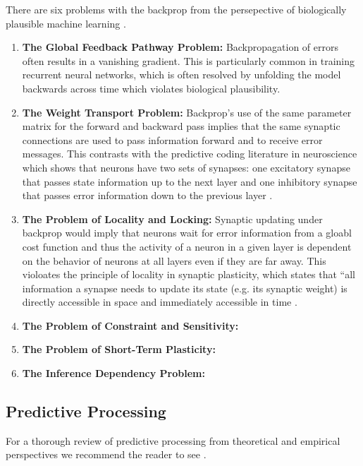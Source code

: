 \documentclass[12pt,english]{article}
\begin{document}
There are six problems with the backprop from the persepective of biologically plausible machine learning \cite{Ororbia22, Ororbia23_a}.
\begin{enumerate}
    \item \textbf{The Global Feedback Pathway Problem:} Backpropagation of errors often results in a vanishing gradient. This is particularly common in training recurrent neural networks, which is  often resolved by unfolding the model backwards across time which violates biological plausibility.
    \item \textbf{The Weight Transport Problem:} Backprop's use of the same parameter matrix for the forward and backward pass implies that the same synaptic connections are used to pass information forward and to receive error messages. This contrasts with the predictive coding literature in neuroscience which shows that neurons have two sets of synapses: one excitatory synapse that passes state information up to the next layer and one inhibitory synapse that passes error information down to the previous layer \cite{WhittingtonBogacz19}.
    \item \textbf{The Problem of Locality and Locking:} Synaptic updating under backprop would imply that neurons wait for error information from a gloabl cost function and thus the activity of a neuron in a given layer is dependent on the behavior of neurons at all layers even if they are far away. This violoates the principle of locality in synaptic plasticity, which states that ``all information a synapse needs to update its state (e.g. its synaptic weight) is directly accessible in space and immediately accessible in time \cite{Khacef23}.
    \item \textbf{The Problem of Constraint and Sensitivity:}
    \item \textbf{The Problem of Short-Term Plasticity:}
    \item \textbf{The Inference Dependency Problem:}
\end{enumerate}


\subsection{Predictive Processing}
For a thorough review of predictive processing from theoretical and empirical perspectives we recommend the reader to see \cite{Millidge22}. 
\end{document}
